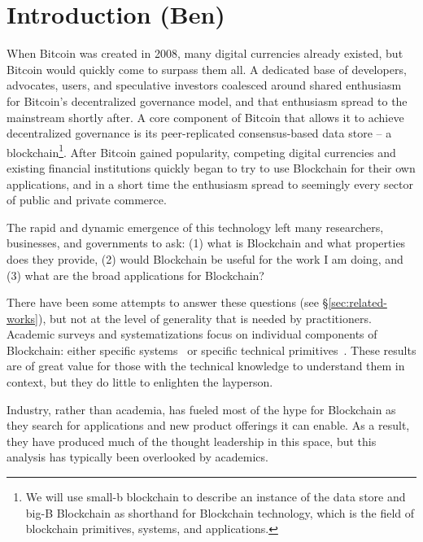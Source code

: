
\section{Introduction (Ben)}
When Bitcoin was created in 2008, many digital currencies already existed, but Bitcoin would quickly come to surpass them all. A dedicated base of developers, advocates, users, and speculative investors coalesced around shared enthusiasm for Bitcoin's decentralized governance model, and that enthusiasm spread to the mainstream shortly after. A core component of Bitcoin that allows it to achieve decentralized governance is its peer-replicated consensus-based data store -- a blockchain\footnote{We will use small-b blockchain to describe an instance of the data store and big-B Blockchain as shorthand for Blockchain technology, which is the field of blockchain primitives, systems, and applications.}. After Bitcoin gained popularity, competing digital currencies and existing financial institutions quickly began to try to use Blockchain for their own applications, and in a short time the enthusiasm spread to seemingly every sector of public and private commerce. 

The rapid and dynamic emergence of this technology left many researchers, businesses, and governments to ask: (1) what is Blockchain and what properties does they provide, (2) would Blockchain be useful for the work I am doing, and (3) what are the broad applications for Blockchain?

There have been some attempts to answer these questions (see \S\ref{sec:related-works}), but not at the level of generality that is needed by practitioners. Academic surveys and systematizations focus on individual components of Blockchain: either specific systems~\cite{BMC+15, Conti17, Narayanan17} or specific technical primitives~\cite{Gervais16, Croman16, Bano17, new_consensus_SOK}. These results are of great value for those with the technical knowledge to understand them in context, but they do little to enlighten the layperson.

Industry, rather than academia, has fueled most of the hype for Blockchain as they search for applications and new product offerings it can enable. As a result, they have produced much of the thought leadership in this space, but this analysis has typically been overlooked by academics.

